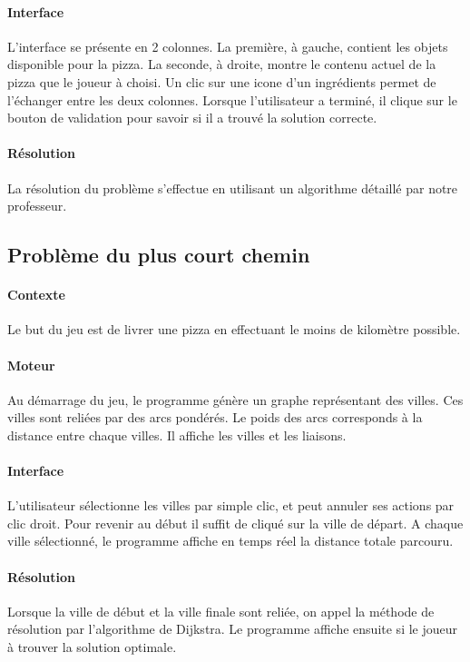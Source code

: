         \paragraph{Interface}
            L'interface se présente en 2 colonnes. La première, à gauche,
            contient les objets disponible pour la pizza. La seconde, à droite,
            montre le contenu actuel de la pizza que le joueur à choisi.
            Un clic sur une icone d'un ingrédients permet de l'échanger entre
            les deux colonnes.
            Lorsque l'utilisateur a terminé, il clique sur le bouton de
            validation pour savoir si il a trouvé la solution correcte.
        \paragraph{Résolution}
            La résolution du problème s'effectue en utilisant un algorithme
            détaillé par notre professeur.
\subsection{Problème du plus court chemin}

        \paragraph{Contexte}
            Le but du jeu est de livrer une pizza en effectuant le moins de kilomètre possible.

        \paragraph{Moteur}
            Au démarrage du jeu, le programme génère un graphe
            représentant des villes. Ces villes sont reliées par des arcs pondérés.
            Le poids des arcs corresponds à la distance entre chaque villes.
		Il affiche les villes et les liaisons.

        \paragraph{Interface}
            L'utilisateur sélectionne les villes par simple clic,
            et peut annuler ses actions par clic droit.
            Pour revenir au début il suffit de cliqué sur la ville de départ.
            A chaque ville sélectionné, le programme
            affiche en temps réel la distance totale parcouru.



        \paragraph{Résolution}
            Lorsque la ville de début et la ville finale sont reliée,
            on appel la méthode de résolution par l'algorithme de Dijkstra.
            Le programme affiche ensuite si le joueur à trouver la solution optimale.

